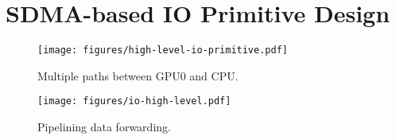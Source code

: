 



\section{SDMA-based IO Primitive Design}
\label{sec:Exchange-IO-primitive}

\begin{figure}
\centering
\begin{minipage}{.3\linewidth}
    \texttt{[image: figures/high-level-io-primitive.pdf]}
    \caption{Multiple paths between GPU0 and CPU.}
    \label{fig:io-primitive-flow}
\end{minipage}
\begin{minipage}{.66\linewidth}
    \texttt{[image: figures/io-high-level.pdf]}
    \caption{Pipelining data forwarding.}
    \label{fig:io-primitive-pipeline}
\end{minipage}
\end{figure}


